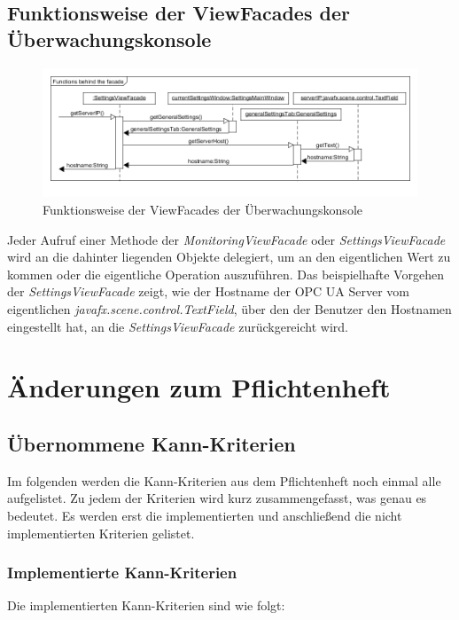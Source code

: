 \documentclass[parskip=full]{scrartcl}
\begin{document}
\subsection{Funktionsweise der ViewFacades der Überwachungskonsole}
\begin{figure}[H]
	\centering
	\includegraphics[scale=0.5]{design/sequence-diagrams/Functions-behind-the-facade.png}
	\caption{Funktionsweise der ViewFacades der Überwachungskonsole}
\end{figure}
Jeder Aufruf einer Methode der \emph{MonitoringViewFacade} oder \emph{SettingsViewFacade} wird an die dahinter liegenden Objekte delegiert, um an den eigentlichen Wert zu kommen oder die eigentliche Operation auszuführen. Das beispielhafte Vorgehen der \emph{SettingsViewFacade} zeigt, wie der Hostname der OPC UA Server vom eigentlichen \emph{javafx.scene.control.TextField}, über den der Benutzer den Hostnamen eingestellt hat, an die \emph{SettingsViewFacade} zurückgereicht wird.

\pagebreak
\section{Änderungen zum Pflichtenheft}

\subsection{\"Ubernommene Kann-Kriterien}
Im folgenden werden die Kann-Kriterien aus dem Pflichtenheft noch einmal alle aufgelistet. Zu jedem der Kriterien wird
kurz zusammengefasst, was genau es bedeutet. Es werden erst die implementierten und anschlie{\ss}end die nicht implementierten
Kriterien gelistet.

\subsubsection{Implementierte Kann-Kriterien}
Die implementierten Kann-Kriterien sind wie folgt:
\end{document}
